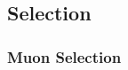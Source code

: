 \documentclass[12pt]{article}
\newcommand{\jpsi}{$J/\psi$ }
\begin{document}






\subsection{Selection}

\subsubsection{Muon Selection}
\label{sec:selection}
\end{document}
